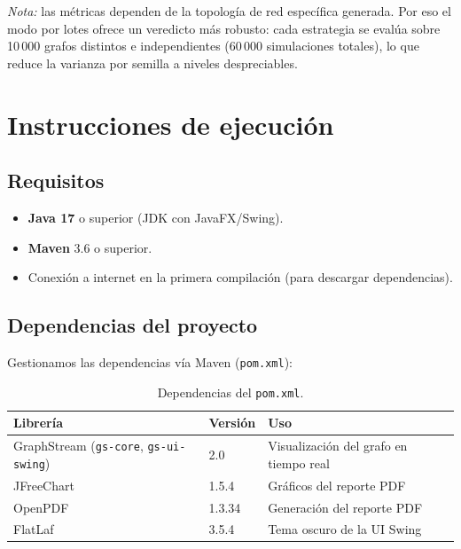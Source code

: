 \documentclass[spanish,notitlepage,letterpaper, 12pt]{article}
\begin{document}
\noindent\textit{Nota:} las m\'etricas dependen de la topolog\'ia de red espec\'ifica generada. Por eso el modo por lotes ofrece un veredicto m\'as robusto: cada estrategia se eval\'ua sobre 10\,000 grafos distintos e independientes (60\,000 simulaciones totales), lo que reduce la varianza por semilla a niveles despreciables.

\newpage
\section{Instrucciones de ejecuci\'on}
\label{anexo:instrucciones}

\subsection{Requisitos}

\begin{itemize}
    \item \textbf{Java 17} o superior (JDK con JavaFX/Swing).
    \item \textbf{Maven} 3.6 o superior.
    \item Conexi\'on a internet en la primera compilaci\'on (para descargar dependencias).
\end{itemize}

\subsection{Dependencias del proyecto}

Gestionamos las dependencias v\'ia Maven (\texttt{pom.xml}):

\begin{table}[H]
\centering
\caption{Dependencias del \texttt{pom.xml}.}
\label{tab:deps}
\begin{tabular}{l l l}
\toprule
\textbf{Librer\'ia} & \textbf{Versi\'on} & \textbf{Uso} \\
\midrule
GraphStream (\texttt{gs-core}, \texttt{gs-ui-swing}) & 2.0 & Visualizaci\'on del grafo en tiempo real \\
JFreeChart & 1.5.4 & Gr\'aficos del reporte PDF \\
OpenPDF & 1.3.34 & Generaci\'on del reporte PDF \\
FlatLaf & 3.5.4 & Tema oscuro de la UI Swing \\
\bottomrule
\end{tabular}
\end{table}
\end{document}
